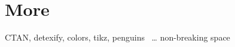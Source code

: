 \section{More}

\begin{frame}
   CTAN, detexify, colors, tikz, penguins ~\ldots
   non-breaking space
\end{frame}